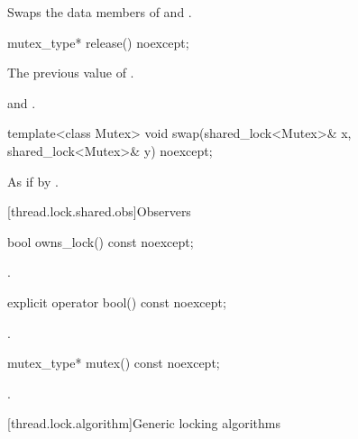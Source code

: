 \begin{itemdescr}
\pnum
\effects Swaps the data members of  and .
\end{itemdescr}

%
\begin{itemdecl}
mutex_type* release() noexcept;
\end{itemdecl}

\begin{itemdescr}
\pnum
\returns The previous value of .

\pnum
\ensures {} and .
\end{itemdescr}

%
\begin{itemdecl}
template<class Mutex>
  void swap(shared_lock<Mutex>& x, shared_lock<Mutex>& y) noexcept;
\end{itemdecl}

\begin{itemdescr}
\pnum
\effects As if by .
\end{itemdescr}

[thread.lock.shared.obs]{Observers}

%
\begin{itemdecl}
bool owns_lock() const noexcept;
\end{itemdecl}

\begin{itemdescr}
\pnum
\returns {}.
\end{itemdescr}

%
\begin{itemdecl}
explicit operator bool() const noexcept;
\end{itemdecl}

\begin{itemdescr}
\pnum
\returns {}.
\end{itemdescr}

%
\begin{itemdecl}
mutex_type* mutex() const noexcept;
\end{itemdecl}

\begin{itemdescr}
\pnum
\returns {}.
\end{itemdescr}

[thread.lock.algorithm]{Generic locking algorithms}

